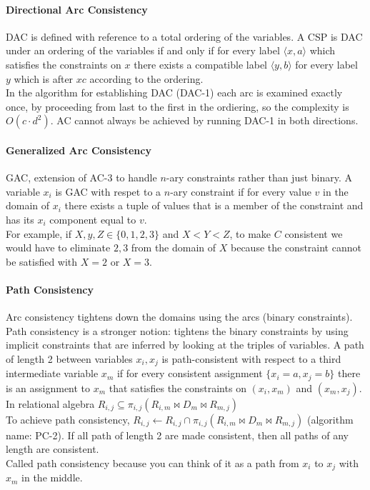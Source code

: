 \documentclass[10pt]{report}
\begin{document}
\paragraph{Directional Arc Consistency} DAC is defined with reference to a total ordering of the variables. A CSP is DAC under an ordering of the variables if and only if for every label $\langle x, a\rangle$ which satisfies the constraints on $x$ there exists a compatible label $\langle y,b\rangle$ for every label $y$ which is after $xc$ according to the ordering.\\
In the algorithm for establishing DAC (DAC-1) each arc is examined exactly once, by proceeding from last to the first in the ordiering, so the complexity is $O(c\cdot d^2)$. AC cannot always be achieved by running DAC-1 in both directions.
\paragraph{Generalized Arc Consistency} GAC, extension of AC-3 to handle $n$-ary constraints rather than just binary. A variable $x_i$ is GAC with respet to a $n$-ary constraint if for every value $v$ in the domain of $x_i$ there exists a tuple of values that is a member of the constraint and has its $x_i$ component equal to $v$.\\
For example, if $X, y, Z \in \{0,1,2,3\}$ and $X < Y < Z$, to make $C$ consistent we would have to eliminate $2, 3$ from the domain of $X$ because the constraint cannot be satisfied with $X=2$ or $X=3$.
\paragraph{Path Consistency} Arc consistency tightens down the domains using the arcs (binary constraints). Path consistency is a stronger notion: tightens the binary constraints by using implicit constraints that are inferred by looking at the triples of variables. A path of length 2 between variables $x_i, x_j$ is path-consistent with respect to a third intermediate variable $x_m$ if for every consistent assignment $\{x_i = a, x_j = b\}$ there is an assignment to $x_m$ that satisfies the constraints on $(x_i, x_m)$ and $(x_m, x_j)$. In relational algebra $R_{i,j}\subseteq\pi_{i,j}(R_{i,m}\bowtie D_m\bowtie R_{m,j})$\\
To achieve path consistency, $R_{i,j}\leftarrow R_{i,j}\cap\pi_{i,j}(R_{i,m}\bowtie D_m\bowtie R_{m,j})$ (algorithm name: PC-2). If all path of length 2 are made consistent, then all paths of any length are consistent.\\
Called path consistency because you can think of it as a path from $x_i$ to $x_j$ with $x_m$ in the middle.
\end{document}
